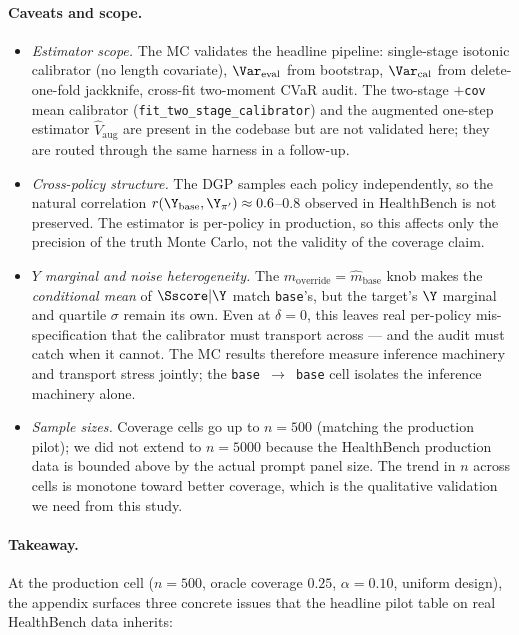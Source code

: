 \paragraph{Caveats and scope.}
\begin{itemize}[leftmargin=*,nosep]
  \item \textit{Estimator scope.} The MC validates the headline pipeline:
    single-stage isotonic calibrator (no length covariate), $\Var_{\text{eval}}$
    from bootstrap, $\Var_{\text{cal}}$ from delete-one-fold jackknife,
    cross-fit two-moment CVaR audit. The two-stage \texttt{$+$cov} mean
    calibrator (\texttt{fit\_two\_stage\_calibrator}) and the augmented
    one-step estimator $\hat V_{\text{aug}}$ are present in the codebase but
    are not validated here; they are routed through the same harness in a
    follow-up.
  \item \textit{Cross-policy structure.} The DGP samples each policy
    independently, so the natural correlation $r(\Y_{\text{base}},
    \Y_{\pi'}) \approx 0.6$--$0.8$ observed in HealthBench is not
    preserved. The estimator is per-policy in production, so this affects
    only the precision of the truth Monte Carlo, not the validity of the
    coverage claim.
  \item \textit{$Y$ marginal and noise heterogeneity.} The
    $m_{\text{override}} = \hat m_{\text{base}}$ knob makes the
    \emph{conditional mean} of $\Sscore | \Y$ match \texttt{base}'s, but the
    target's $\Y$ marginal and quartile $\sigma$ remain its own. Even at
    $\delta{=}0$, this leaves real per-policy mis-specification that the
    calibrator must transport across — and the audit must catch when it
    cannot. The MC results therefore measure inference machinery and
    transport stress jointly; the \texttt{base $\to$ base} cell isolates
    the inference machinery alone.
  \item \textit{Sample sizes.} Coverage cells go up to $n{=}500$ (matching
    the production pilot); we did not extend to $n{=}5000$ because the
    HealthBench production data is bounded above by the actual prompt
    panel size. The trend in $n$ across cells is monotone toward better
    coverage, which is the qualitative validation we need from this study.
\end{itemize}

\paragraph{Takeaway.}
At the production cell ($n{=}500$, oracle coverage $0.25$,
$\alpha{=}0.10$, uniform design), the appendix surfaces three concrete
issues that the headline pilot table on real HealthBench data inherits:

